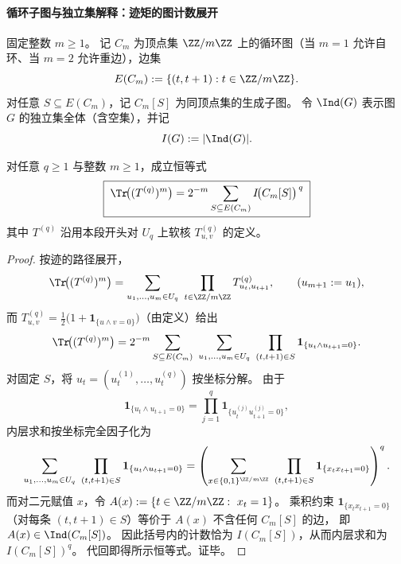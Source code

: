\paragraph{循环子图与独立集解释：迹矩的图计数展开}
固定整数 \(m\ge 1\)。
记 \(C_m\) 为顶点集 \(\ZZ/m\ZZ\) 上的循环图（当 \(m=1\) 允许自环、当 \(m=2\) 允许重边），边集
\[
E(C_m):=\{(t,t+1):t\in\ZZ/m\ZZ\}.
\]
对任意 \(S\subseteq E(C_m)\)，记 \(C_m[S]\) 为同顶点集的生成子图。
令 \(\Ind(G)\) 表示图 \(G\) 的独立集全体（含空集），并记
\[
I(G):=|\Ind(G)|.
\]

\begin{conclusion}\label{con:xi-terminal-replica-softcore-trace-moment-cycle-subgraph-independent-sets}
对任意 \(q\ge 1\) 与整数 \(m\ge 1\)，成立恒等式
\[
\boxed{\;
\Tr\!\bigl((T^{(q)})^m\bigr)=2^{-m}\sum_{S\subseteq E(C_m)} I\!\bigl(C_m[S]\bigr)^{\,q}\;}
\]
其中 \(T^{(q)}\) 沿用本段开头对 \(U_q\) 上软核 \(T^{(q)}_{u,v}\) 的定义。
\end{conclusion}
\begin{proof}
按迹的路径展开，
\[
\Tr\!\bigl((T^{(q)})^m\bigr)
=\sum_{u_1,\dots,u_m\in U_q}\ \prod_{t\in\ZZ/m\ZZ}T^{(q)}_{u_t,u_{t+1}},
\qquad (u_{m+1}:=u_1),
\]
而 \(T^{(q)}_{u,v}=\frac12\bigl(1+\mathbf{1}_{\{u\wedge v=0\}}\bigr)\)（由定义）给出
\[
\Tr\!\bigl((T^{(q)})^m\bigr)
=2^{-m}\sum_{S\subseteq E(C_m)}\ \sum_{u_1,\dots,u_m\in U_q}\ \prod_{(t,t+1)\in S}\mathbf{1}_{\{u_t\wedge u_{t+1}=0\}}.
\]
对固定 \(S\)，将 \(u_t=(u_t^{(1)},\dots,u_t^{(q)})\) 按坐标分解。
由于
\[
\mathbf{1}_{\{u_t\wedge u_{t+1}=0\}}=\prod_{j=1}^{q}\mathbf{1}_{\{u_t^{(j)}u_{t+1}^{(j)}=0\}},
\]
内层求和按坐标完全因子化为
\[
\sum_{u_1,\dots,u_m\in U_q}\ \prod_{(t,t+1)\in S}\mathbf{1}_{\{u_t\wedge u_{t+1}=0\}}
=\left(\sum_{x\in\{0,1\}^{\ZZ/m\ZZ}}\ \prod_{(t,t+1)\in S}\mathbf{1}_{\{x_t x_{t+1}=0\}}\right)^{q}.
\]
而对二元赋值 \(x\)，令 \(A(x):=\{t\in\ZZ/m\ZZ:\ x_t=1\}\)。
乘积约束 \(\mathbf{1}_{\{x_t x_{t+1}=0\}}\)（对每条 \((t,t+1)\in S\)）等价于 \(A(x)\) 不含任何 \(C_m[S]\) 的边，
即 \(A(x)\in\Ind(C_m[S])\)。
因此括号内的计数恰为 \(I(C_m[S])\)，从而内层求和为 \(I(C_m[S])^{q}\)。
代回即得所示恒等式。证毕。
\end{proof}

